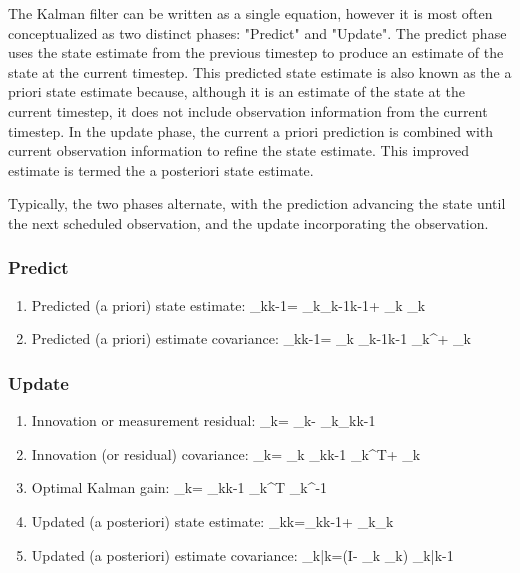 \documentclass{article}
\begin{document}
The Kalman filter can be written as a single equation, however it is most often conceptualized as two distinct phases: "Predict" and "Update". The predict phase uses the state estimate from the previous timestep to produce an estimate of the state at the current timestep. This predicted state estimate is also known as the a priori state estimate because, although it is an estimate of the state at the current timestep, it does not include observation information from the current timestep. In the update phase, the current a priori prediction is combined with current observation information to refine the state estimate. This improved estimate is termed the a posteriori state estimate.

Typically, the two phases alternate, with the prediction advancing the state until the next scheduled observation, and the update incorporating the observation. 

\subsubsection{Predict}
\begin{enumerate}
    \item Predicted (a priori) state estimate: {_{k\mid k-1}= _{k}{}_{k-1\mid k-1}+ _{k} _{k}}
    
    \item Predicted (a priori) estimate covariance: {\displaystyle {} _{k\mid k-1}= _{k} _{k-1\mid k-1} _{k}^{}+ _{k}}
\end{enumerate}

\subsubsection{Update}
\begin{enumerate}
    \item Innovation or measurement residual: {_{k}= _{k}- _{k}{}_{k\mid k-1}} 
    
    \item Innovation (or residual) covariance: {\displaystyle {} _{k}= _{k} _{k\mid k-1} _{k}^{T}+ _{k}}
    
    \item Optimal Kalman gain: {\displaystyle {} _{k}= _{k\mid k-1} _{k}^{T} _{k}^{-1}} 
    
    \item Updated (a posteriori) state estimate: {_{k\mid k}={}_{k\mid k-1}+ _{k}{}_{k}} 
    
    \item Updated (a posteriori) estimate covariance: {\displaystyle {} _{k|k}=(I- _{k} _{k}) _{k|k-1}}
    
\end{enumerate}
\end{document}
